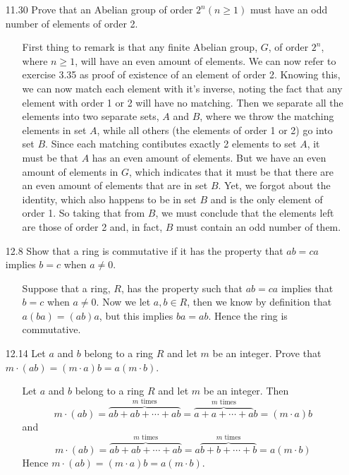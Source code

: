 \documentclass[12pt]{article}
\begin{document}
\begin{enumerate}
\item[11.30] Prove that an Abelian group of order $2^n (n \geq 1)$ must have an odd number of elements of order 2.
\begin{enumerate}
\item[] First thing to remark is that any finite Abelian group, $G$, of order $2^n$, where $n \geq 1$, will
have an even amount of elements. We can now refer to exercise 3.35 as proof of existence of an element of 
order 2. Knowing this, we can now match each element with it's inverse, noting the fact that
any element with order 1 or 2 will have no matching. Then we separate all the elements into two separate sets, 
$A$ and $B$, where we throw the matching elements in set $A$, while all others (the elements of order 1 or 2) 
go into set $B$. Since each matching contibutes exactly 2 elements to set $A$, it must be that $A$ has an even
amount of elements. But we have an even amount of elements in $G$, which indicates that it must be that 
there are an even amount of elements that are in set $B$. Yet, we forgot about the identity, which also happens 
to be in set $B$ and is the only element of order 1. So taking that from $B$, we must conclude that
the elements left are those of order 2 and, in fact, $B$ must contain an odd number of them.
\end{enumerate}

\item[12.8] Show that a ring is commutative if it has the property that $ab = ca$ implies $b = c$ when $a \neq 0$.
\begin{enumerate}
\item[] Suppose that a ring, $R$, has the property such that $ab = ca$ implies that $b = c$ when $a \neq 0$.
Now we let $a, b \in R$, then we know by definition that $a(ba) = (ab)a$, but this implies $ba = ab$.
Hence the ring is commutative.
\end{enumerate}

\item[12.14] Let $a$ and $b$ belong to a ring $R$ and let $m$ be an integer. Prove that 
$m \cdot (ab) = (m \cdot a)b = a(m \cdot b)$.
\begin{enumerate}
\item[] Let $a$ and $b$ belong to a ring $R$ and let $m$ be an integer. Then
\[
m \cdot (ab) = \overbrace{ab + ab + \cdots + ab}^{\mbox{$m$ times}} = 
\overbrace{a + a + \cdots + a}^{\mbox{$m$ times}}b
= (m \cdot a)b
\]
and
\[
m \cdot (ab) = \overbrace{ab + ab + \cdots + ab}^{\mbox{$m$ times}} = 
a\overbrace{b + b + \cdots + b}^{\mbox{$m$ times}}
= a(m \cdot b)
\]
Hence $m \cdot (ab) = (m \cdot a)b = a(m \cdot b)$.
\end{enumerate}


\end{enumerate}
\end{document}
